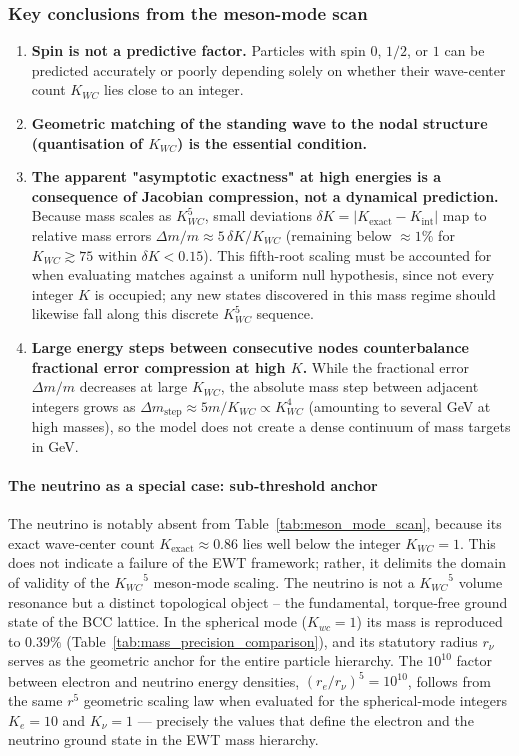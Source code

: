 \documentclass[10pt,a4paper]{article}
\begin{document}
\subsubsection{Key conclusions from the meson-mode scan}
\begin{enumerate}
	\item \textbf{Spin is not a predictive factor.} Particles with spin $0$, $1/2$, or $1$ can be predicted accurately or poorly depending solely on whether their wave-center count \(K_{WC}\) lies close to an integer.
	
	\item \textbf{Geometric matching of the standing wave to the nodal structure (quantisation of \(K_{WC}\)) is the essential condition.}
	
	\item \textbf{The apparent "asymptotic exactness" at high energies is a consequence of Jacobian compression, not a dynamical prediction.} Because mass scales as \(K_{WC}^5\), small deviations \(\delta K = |K_{\text{exact}} - K_{\text{int}}|\) map to relative mass errors \(\Delta m/m \approx 5\,\delta K/K_{WC}\) (remaining below \(\approx 1\%\) for \(K_{WC} \gtrsim 75\) within \(\delta K < 0.15\)). This fifth-root scaling must be accounted for when evaluating matches against a uniform null hypothesis, since not every integer \(K\) is occupied; any new states discovered in this mass regime should likewise fall along this discrete \(K_{WC}^5\) sequence.
	\item \textbf{Large energy steps between consecutive nodes counterbalance fractional error compression at high \(K\).} While the fractional error \(\Delta m/m\) decreases at large \(K_{WC}\), the absolute mass step between adjacent integers grows as \(\Delta m_{\text{step}} \approx 5m/K_{WC} \propto K_{WC}^4\) (amounting to several GeV at high masses), so the model does not create a dense continuum of mass targets in GeV.
\end{enumerate}

\paragraph{The neutrino as a special case: sub‑threshold anchor}
The neutrino is notably absent from Table~\ref{tab:meson_mode_scan}, because its exact wave‑center count $K_{\text{exact}}\approx 0.86$ lies well below the integer $K_{WC}=1$. 
This does not indicate a failure of the EWT framework; rather, it delimits the domain of validity of the ${K_{WC}}^5$ meson‑mode scaling. 
The neutrino is not a ${K_{WC}}^5$ volume resonance but a distinct topological object – the fundamental, torque‑free ground state of the BCC lattice. 
In the spherical mode ($K_{wc}=1$) its mass is reproduced to $0.39\%$ (Table~\ref{tab:mass_precision_comparison}), and its statutory radius $r_\nu$ serves as the geometric anchor for the entire particle hierarchy. 
The $10^{10}$ factor between electron and neutrino energy densities, 
$(r_e/r_\nu)^5 = 10^{10}$, follows from the same $r^5$ geometric scaling 
law when evaluated for the spherical‑mode integers $K_e=10$ and $K_\nu=1$ 
--- precisely the values that define the electron and the neutrino ground 
state in the EWT mass hierarchy.
\end{document}

